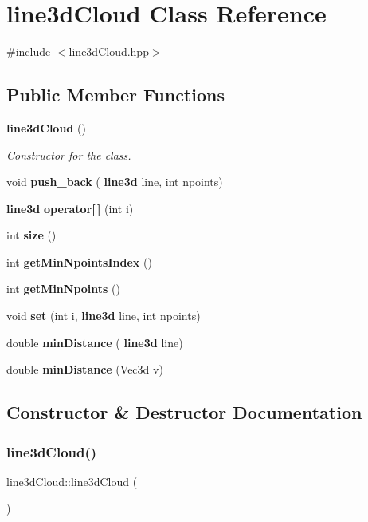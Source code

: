 \section{line3d\+Cloud Class Reference}
\label{classline3d_cloud}


{\ttfamily \#include $<$line3d\+Cloud.\+hpp$>$}

\subsection*{Public Member Functions}
\begin{DoxyCompactItemize}
\item 
\textbf{ line3d\+Cloud} ()
\begin{DoxyCompactList}\small\item\em Constructor for the class. \end{DoxyCompactList}\item 
void \textbf{ push\+\_\+back} (\textbf{ line3d} line, int npoints)
\item 
\textbf{ line3d} \textbf{ operator[$\,$]} (int i)
\item 
int \textbf{ size} ()
\item 
int \textbf{ get\+Min\+Npoints\+Index} ()
\item 
int \textbf{ get\+Min\+Npoints} ()
\item 
void \textbf{ set} (int i, \textbf{ line3d} line, int npoints)
\item 
double \textbf{ min\+Distance} (\textbf{ line3d} line)
\item 
double \textbf{ min\+Distance} (Vec3d v)
\end{DoxyCompactItemize}


\subsection{Constructor \& Destructor Documentation}
\mbox{\label{classline3d_cloud_ab03dcf5e617a3693cf7b362028dd61fb}} 
\subsubsection{line3d\+Cloud()}
{\footnotesize\ttfamily line3d\+Cloud\+::line3d\+Cloud (\begin{DoxyParamCaption}{ }\end{DoxyParamCaption})}



